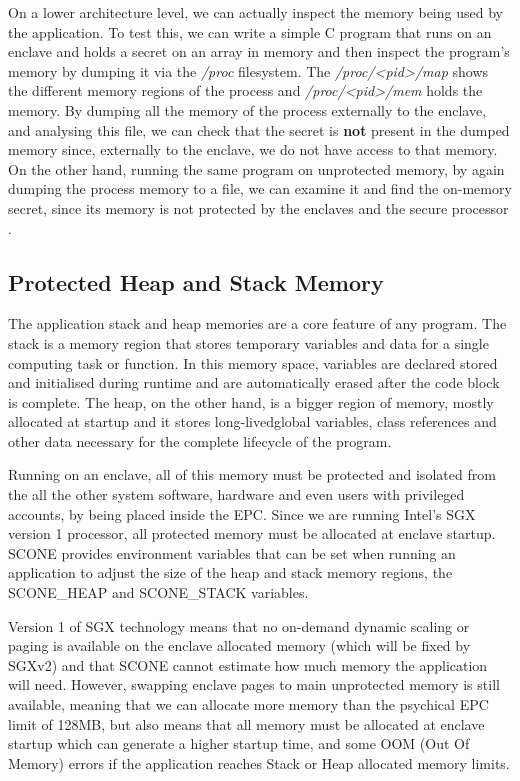 On a lower architecture level, we can actually inspect the memory being used by the application. To test this, we can write a simple C program that runs on an enclave and holds a secret on an array in memory and then inspect the program's memory by dumping it via the \textit{/proc} filesystem. The \textit{/proc/<pid>/map} shows the different memory regions of the process and \textit{/proc/<pid>/mem} holds the memory. By dumping all the memory of the process externally to the enclave, and analysing this file, we can check that the secret is \textbf{not} present in the dumped memory since, externally to the enclave, we do not have access to that memory. On the other hand, running the same program on unprotected memory, by again dumping the process memory to a file, we can examine it and find the on-memory secret, since its memory is not protected by the enclaves and the secure processor \cite{scone:debug}.

\subsection{Protected Heap and Stack Memory}
\label{ssec:protected_heap_and_stack_memory}

The application stack and heap memories are a core feature of any program. The stack is a memory region that stores temporary variables and data for a single computing task or function. In this memory space, variables are declared stored and initialised during runtime and are automatically erased after the code block is complete. The heap, on the other hand, is a bigger region of memory, mostly allocated at startup and it stores long-livedglobal variables, class references and other data necessary for the complete lifecycle of the program.

Running on an enclave, all of this memory must be protected and isolated from the all the other system software, hardware and even users with privileged accounts, by being placed inside the \gls{EPC}. Since we are running Intel's \gls{SGX} version 1 processor, all protected memory must be allocated at enclave startup. SCONE provides environment variables that can be set when running an application to adjust the size of the heap and stack memory regions, the SCONE\_HEAP and SCONE\_STACK variables.

Version 1 of \gls{SGX} technology means that no on-demand dynamic scaling or paging is available on the enclave allocated memory (which will be fixed by \gls{SGX}v2) and that SCONE cannot estimate how much memory the application will need. However, swapping enclave pages to main unprotected memory is still available, meaning that we can allocate more memory than the psychical \gls{EPC} limit of 128\gls{MB}, but also means that all memory must be allocated at enclave startup which can generate a higher startup time, and some \gls{OOM} (Out Of Memory) errors if the application reaches Stack or Heap allocated memory limits.

